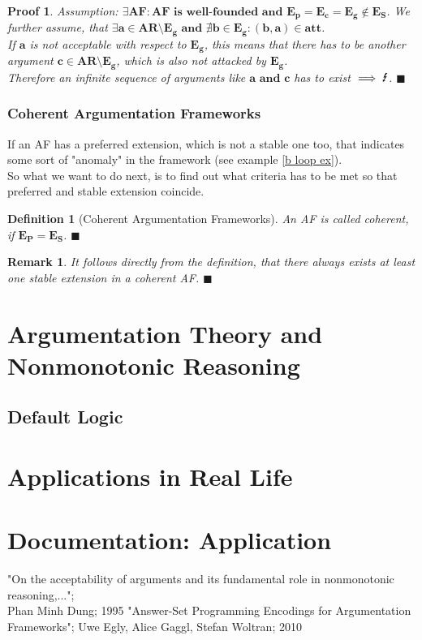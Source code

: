 \documentclass[12pt]{report}
\numberwithin{figure}{chapter}
\theoremstyle{break}
\newtheorem{defn}{Definition}[chapter]
\newtheorem*{prf}{Proof}
\newtheorem*{rmrk}{Remark}
\newenvironment{mydefn}{\begin{defn}}{$\blacksquare$ \end{defn}}
\newenvironment{myprf}{\begin{prf}}{$\blacksquare$ \end{prf}}
\newenvironment{myrmrk}{\begin{rmrk}}{$\blacksquare$ \end{rmrk}}
\begin{document}
\begin{myprf}
Assumption: $\bm{\exists AF: \text{AF is well-founded and } E_{p}=E_{c}=E_{g} \notin E_{S}}$.
We further assume, that $\bm{\exists a \in AR \text{\textbackslash} E_{g} \text{ and } \nexists b \in E_{g}:(b,a) \in att}$.\\
\bigskip
If $\bm{a}$ is not acceptable with respect to $\bm{E_{g}}$, this means that there has to be another argument $\bm{c \in AR \text{\textbackslash} E_{g}}$, 
which is also not attacked by $\bm{E_{g}}$. \\ Therefore an infinite sequence of arguments like $\bm{a \text{ and }c}$ has to exist $\implies \text{\Lightning}$.
\end{myprf}

\newpage

\subsection{Coherent Argumentation Frameworks}
If an AF has a preferred extension, which is not a stable one too, that indicates some sort of "anomaly" in the framework (see example \ref{b loop ex}).\\
So what we want to do next, is to find out what criteria has to be met so that preferred and stable extension coincide.

\begin{mydefn}[Coherent Argumentation Frameworks]
An AF is called coherent, if $\bm{E_{P} = E_{S}}$.
\end{mydefn}

\begin{myrmrk}
It follows directly from the definition, that there always exists at least one stable extension in a coherent AF.
\end{myrmrk}

\chapter{Argumentation Theory and Nonmonotonic Reasoning}
\section{Default Logic}

\chapter{Applications in Real Life}

\chapter{Documentation: Application}


\begin{thebibliography}{1}
	 "On the acceptability of arguments and its fundamental role in nonmonotonic reasoning,...";\\Phan Minh Dung; 1995
	 "Answer-Set Programming Encodings for Argumentation Frameworks"; Uwe Egly, Alice Gaggl, Stefan Woltran; 2010  
\end{thebibliography}
\end{document}

